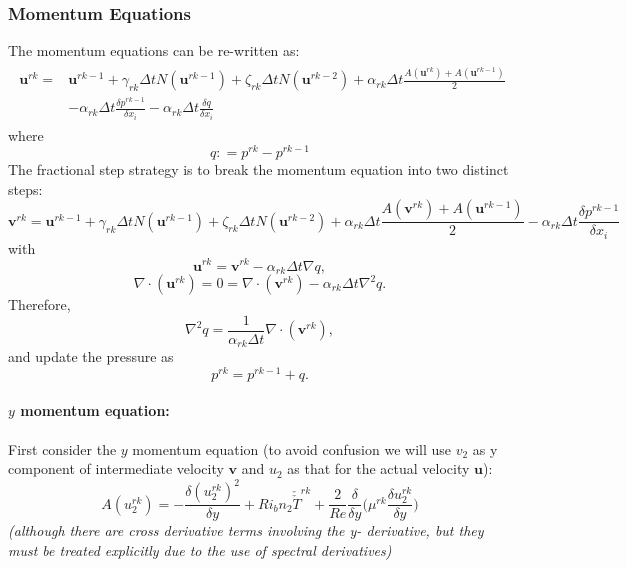 \documentclass[preprint,12pt]{article}
\begin{document}
\subsubsection{Momentum Equations}
The momentum equations can be re-written as:
\begin{align}
\begin{split}
\mathbf{u}^{rk}=&\mathbf{u}^{rk-1}+\gamma_{rk}\Delta t N(\mathbf{u}^{rk-1})+\zeta_{rk}\Delta t N(\mathbf{u}^{rk-2})+\alpha_{rk}\Delta t\frac{A(\mathbf{u}^{rk})+A(\mathbf{u}^{rk-1})}{2}\\&-\alpha_{rk}\Delta t\frac{\delta p^{rk-1}}{\delta x_i}-\alpha_{rk}\Delta t\frac{\delta q}{\delta x_i}
\end{split}
\end{align} 
where 
\begin{equation}
q\mathrel{\mathop:}= p^{rk}-p^{rk-1}
\end{equation}
The fractional step strategy is to break the momentum equation into two distinct steps:
\begin{equation}
\mathbf{v}^{rk}=\mathbf{u}^{rk-1}+\gamma_{rk}\Delta t N(\mathbf{u}^{rk-1})+\zeta_{rk}\Delta t N(\mathbf{u}^{rk-2})+\alpha_{rk}\Delta t\frac{A(\mathbf{v}^{rk})+A(\mathbf{u}^{rk-1})}{2}-\alpha_{rk}\Delta t\frac{\delta p^{rk-1}}{\delta x_i}
\end{equation} 
with 
\begin{equation}
\mathbf{u}^{rk}=\mathbf{v}^{rk}-\alpha_{rk}\Delta t \nabla q,
\end{equation}
\begin{equation}
\nabla\cdot(\mathbf{u}^{rk})=0=\nabla\cdot(\mathbf{v}^{rk})-\alpha_{rk}\Delta t \nabla ^2 q.
\end{equation}
Therefore,
\begin{equation}
\nabla ^2 q=\frac{1}{\alpha_{rk}\Delta t}\nabla\cdot(\mathbf{v}^{rk}),
\end{equation}
and update the pressure as
\begin{equation}
p^{rk}=p^{rk-1}+q.
\end{equation}
\paragraph{$y$ momentum equation:}
First consider the $y$ momentum equation (to avoid confusion we will use $v_2$ as y component of intermediate velocity $\mathbf{v}$ and $u_2$ as that for the actual velocity $\mathbf{u}$):
\begin{equation}\label{eq:implicit_V}
A(u_2^{rk})=-\frac{\delta ({u_2^{rk}})^2}{\delta y}+Ri_b n_2\check{\check{T}}^{rk}+\frac{2}{Re}\frac{\delta}{\delta y}\Big(\mu^{rk}\frac{\delta u_2^{rk}}{\delta y}\Big)
\end{equation}
\emph{(although there are cross derivative terms involving the y- derivative, but they must be treated explicitly due to the use of spectral derivatives)}
\end{document}
